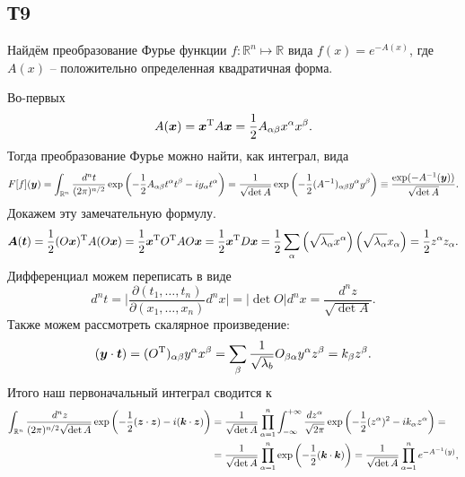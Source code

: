 \subsection{Т9}

Найдём преобразование Фурье функции $f \colon  \mathbb{R}^n \mapsto \mathbb{R}$ вида $f(x) = e^{-A(x)}$, где $A(x)$ -- положительно определенная квадратичная форма.

Во-первых
\begin{equation*}
    A(\mbox{\boldmath $x$}) = \mbox{\boldmath $x$}^{\text{T}} A \mbox{\boldmath $x$} = \frac{1}{2} A_{\alpha \beta} x^\alpha x^\beta.
\end{equation*}
Тогда преобразование Фурье можно найти, как интеграл, вида
\begin{equation}
    F[f](\mbox{\boldmath $y$})
    =
     \int_{\mathbb{R}^n} \frac{d^n t}{(2\pi)^{n/2}} \exp\left(
        - \frac{1}{2} A_{\alpha \beta} t^\alpha t^\beta - i y_\alpha t^\alpha
    \right)
    =
    \frac{1}{\sqrt{\det A}} \exp\left(
        - \frac{1}{2} (A^{-1})_{\alpha \beta} y^\alpha y^\beta
    \right) \equiv
    \frac{\exp(-A^{-1}(\mbox{\boldmath $y$}))}{\sqrt{\det A}}.
\end{equation}
Докажем эту замечательную формулу. 
\begin{equation*}
    \mbox{\boldmath $A$}(\mbox{\boldmath $t$}) = \frac{1}{2} (O \mbox{\boldmath $x$})^{\text{T}} A (O \mbox{\boldmath $x$}) = \frac{1}{2} \mbox{\boldmath $x$}^{\text{T}} O^{\text{T}} A O \mbox{\boldmath $x$} = \frac{1}{2} \mbox{\boldmath $x$}^{\text{T}} D \mbox{\boldmath $x$} = \frac{1}{2} \sum_\alpha \left(
        \sqrt{\lambda_\alpha} x^\alpha
    \right) \left(
        \sqrt{ \lambda_\alpha} x_\alpha
    \right) = \frac{1}{2} z^\alpha z_\alpha.
\end{equation*}
Дифференциал можем переписать в виде
\begin{equation*}
    d^n t = \bigg|
        \frac{\partial (t_1, \ldots, t_n)}{\partial (x_1, \ldots, x_n)} d^n x
    \bigg| = |\det O| d^n x = \frac{d^n z}{\sqrt{\det A}}.
\end{equation*}
Также можем рассмотреть скалярное произведение:
\begin{equation*}
    (\mbox{\boldmath $y$} \cdot \mbox{\boldmath $t$}) = (O^{\text{T}})_{\alpha \beta} y^\alpha x^\beta = \sum_\beta \frac{1}{\sqrt{\lambda_b}} O_{\beta\alpha} y^\alpha z^\beta = k_\beta z^\beta.
\end{equation*}
Итого наш первоначальный интеграл сводится к
\begin{align*}
    \int_{\mathbb{R}^n} \frac{\, d^n z}{(2\pi)^{n/2} \sqrt{\det A}} \exp\left(
        - \frac{1}{2} (\mbox{\boldmath $z$} \cdot \mbox{\boldmath $z$}) - i (\mbox{\boldmath $k$} \cdot \mbox{\boldmath $z$})
    \right) 
    &= 
    \frac{1}{\sqrt{\det A}} \prod_{\alpha=1}^n \int_{-\infty}^{+\infty}
    \frac{d z^\alpha}{\sqrt{2\pi}} \exp\left(
        - \frac{1}{2} (z^\alpha)^2 - i k_\alpha z^\alpha
    \right)
    = \\ &= 
    \frac{1}{\sqrt{\det A}} \prod_{\alpha=1}^n \exp\left(-\frac{1}{2} (\mbox{\boldmath $k$} \cdot \mbox{\boldmath $k$})\right) = 
    \frac{1}{\sqrt{\det A}} \prod_{\alpha=1}^n e^{-A^{-1} (y)},
\end{align*}
